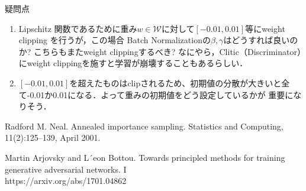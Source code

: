 \documentclass[uplatex, dvipdfmx]{jsarticle}
\theoremstyle{definition}
\begin{document}
    \begin{itembox}[l]{疑問点}
        \begin{enumerate}
            \item Lipschitz 関数であるために重み$w \in \mathcal{W}$に対して$[-0.01, 0.01]$等にweight clipping を行うが，この場合
            Batch Normalizationの$\beta, \gamma$はどうすれば良いのか? こちらもまたweight clippingするべき?
            なにやら，Clitic（Discriminator）にweight clippingを施すと学習が崩壊することもあるらしい．

            \item $[−0.01,0.01] $を超えたものはclipされるため、初期値の分散が大きいと全て-0.01か0.01になる．よって重みの初期値をどう設定しているかが
            重要になりそう．
        \end{enumerate}
        

    \end{itembox}
    \newpage
    \begin{thebibliography}{10}
        Radford M. Neal. Annealed importance sampling. 
        Statistics and Computing, 11(2):125–139, April 2001.

        Martin Arjovsky and L´eon Bottou.
        Towards principled methods for training generative adversarial networks. I \\
        https://arxiv.org/abs/1701.04862
    \end{thebibliography}
    
    
\end{document}
